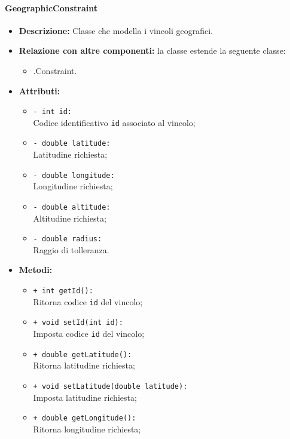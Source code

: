 \paragraph{GeographicConstraint}
\label{botgeographicconstraint}
\begin{flushleft}
\begin{itemize}
\item \textbf{Descrizione:} Classe che modella i vincoli geografici.
\item \textbf{Relazione con altre componenti:} la classe estende la seguente classe:
		\begin{itemize}
			\item \smodel{}.Constraint.
		\end{itemize}
\item \textbf{Attributi:}
\begin{sloppypar}
\begin{itemize}
\item \texttt{- int id:}\\ Codice identificativo \texttt{id} associato al vincolo;
\item \texttt{- double latitude:}\\ Latitudine richiesta;
\item \texttt{- double longitude:}\\ Longitudine richiesta;
\item \texttt{- double altitude:}\\ Altitudine richiesta;
\item \texttt{- double radius:}\\ Raggio di tolleranza.
\end{itemize}
\end{sloppypar}
\item \textbf{Metodi:}
\begin{sloppypar}
\begin{itemize}
\item \texttt{+ int getId():}\\ Ritorna codice \texttt{id} del vincolo;
\item \texttt{+ void setId(int id):}\\ Imposta codice \texttt{id} del vincolo;
\item \texttt{+ double getLatitude():}\\ Ritorna latitudine richiesta;
\item \texttt{+ void setLatitude(double latitude):}\\ Imposta latitudine richiesta;
\item \texttt{+ double getLongitude():}\\ Ritorna longitudine richiesta;

\end{itemize}
\end{sloppypar}
\end{itemize}
\end{flushleft}
